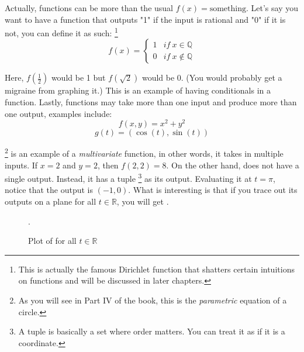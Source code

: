 Actually, functions can be more than the usual \(f(x)=\text{something}\). Let's say you want to have a function that outputs "1" if the input is rational and "0" if it is not, you can define it as such: \footnote{This is actually the famous Dirichlet function that shatters certain intuitions on functions and will be discussed in later chapters.}
\begin{equation}
  f(x)=
  \begin{cases}
    1 & \textit{if}\ x \in \mathbb{Q} \\
    0 & \textit{if}\ x \notin \mathbb{Q}
  \end{cases}
\end{equation}


Here, \(f(\frac{1}{2})\) would be 1 but \(f(\sqrt{2})\) would be 0. (You would probably get a migraine from graphing it.) This is an example of having conditionals in a function. Lastly, functions may take more than one input and produce more than one output, examples include:
\begin{equation}
  f(x,y)=x^2+y^2 
  \label{circle}
\end{equation}
\begin{equation}
  \label{paramcircle}
  g(t)=(\cos(t), \sin(t))
\end{equation}

\footnote{As you will see in Part IV of the book, this is the \textit{parametric} equation of a circle.}
is an example of a \textit{multivariate} function, in other words, it takes in multiple inputs. If \(x=2\) and \(y=2\), then \(f(2,2)=8\). On the other hand,  does not have a single output. Instead, it has a tuple \footnote{A tuple is basically a set where order matters. You can treat it as if it is a coordinate.} as its output. Evaluating it at \(t=\pi\), notice that the output is \((-1, 0)\). What is interesting is that if you trace out its outputs on a plane for all \(t \in \mathbb{R}\), you will get .
\begin{figure}[h]
  \centering
  \tiny\caption{Plot of  for all \(t \in \mathbb{R}\)}.
  \label{param}
\end{figure}
